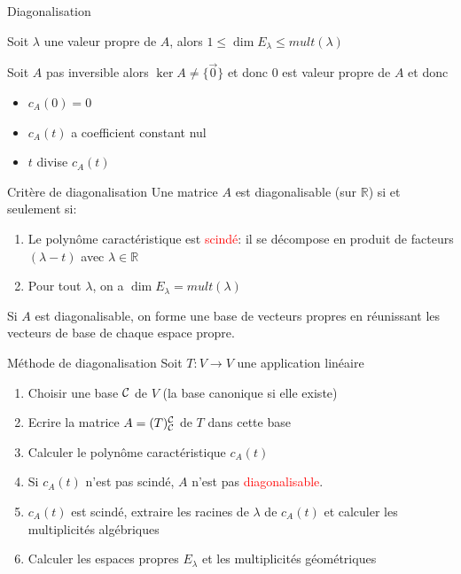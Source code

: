 \begin{parag}{Diagonalisation}
    \begin{truc}
        Soit $\lambda$ une valeur propre de $A$, alors $1 \leq \dim E_\lambda \leq mult(\lambda)$
    \end{truc}
    \begin{truc}
        Soit $A$ pas inversible alors $\ker A \neq \{\vec{0}\}$ et donc $0$ est valeur propre de $A$ et donc \\
        \begin{itemize}
            \item $c_A(0) =0$\\
            \item $c_A(t)$ a coefficient constant nul
            \item $t$ divise $c_A(t)$
        \end{itemize}
    \end{truc}
    \begin{subparag}{Critère de diagonalisation}
        Une matrice $A$ est diagonalisable (sur $\mathbb{R}$) si et seulement si:
        \begin{enumerate}
            \item Le polynôme caractéristique est \textcolor{red}{scindé}: il se décompose en produit de facteurs $(\lambda - t)$ avec $\lambda \in \mathbb{R}$
            \item Pour tout $\lambda$, on a $\dim E_\lambda = mult(\lambda)$
        \end{enumerate}
        Si $A$ est diagonalisable, on forme une base de vecteurs propres en réunissant les vecteurs de base de chaque espace propre.
    \end{subparag}
    \begin{subparag}{Méthode de diagonalisation}
        Soit $T: V \to V$ une application linéaire
        \begin{enumerate}
            \item Choisir une base $\mathcal{C}$ de $V$ (la base canonique si elle existe)
            \item Ecrire la matrice $A = (T)_{\mathcal{C}}^{\mathcal{C}}$ de $T$ dans cette base
            \item Calculer le polynôme caractéristique $c_A(t)$
            \item Si $c_A(t)$ n'est pas scindé, $A$ n'est pas \textcolor{red}{diagonalisable}.
            \item $c_A(t)$ est scindé, extraire les racines de $\lambda$ de $c_A(t)$ et calculer les multiplicités algébriques
            \item Calculer les espaces propres $E_\lambda$ et les multiplicités géométriques

\end{enumerate}
\end{subparag}
\end{parag}
